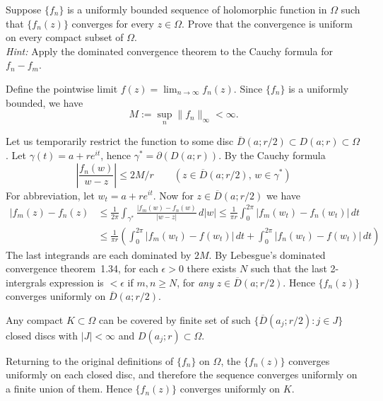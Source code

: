 \begin{enumerate}
\begin{excopy} 
Suppose 
\label{ex:fn:uniform}
\(\{f_n\}\) is a uniformly bounded sequence of holomorphic function
in \(\Omega\) such that  \(\{f_n(z)\}\) converges for every \(z\in \Omega\).
Prove that the convergence is uniform on every compact subset of \(\Omega\).
\\ \emph{Hint:} Apply the dominated convergence theorem to the Cauchy formula
for \(f_n - f_m\).
\end{excopy}

Define the pointwise limit \(f(z) = \lim_{n\to\infty} f_n(z)\).
Since \(\{f_n\}\) is a uniformly bounded, we have
\begin{equation*}
M := \sup_n \|f_n\|_\infty < \infty.
\end{equation*}

Let us temporarily restrict the function to some disc
\(\overline{D}(a;r/2)\subset D(a;r) \subset\Omega\).
Let \(\gamma(t) = a+re^{it}\), hence \(\gamma^* = \partial(D(a;r))\).
By the Cauchy formula
\begin{equation*}
\left| \frac{f_n(w)}{w - z}\right| \leq 2M/r
\qquad (z\in \overline{D}(a;r/2),\, w \in \gamma^*)
\end{equation*}
For abbreviation, let \(w_t = a+re^{it}\).
Now for \(z\in \overline{D}(a;r/2)\) we have
\begin{align*}
|f_m(z) - f_n(z) 
&\leq \frac{1}{2\pi} \int_{\gamma^*} \frac{|f_m(w)-f_n(w)}{|w-z|}\,d|w|
 \leq \frac{1}{\pi r}  \int_0^{2\pi} |f_m(w_t)-f_n(w_t)|\,dt \\
& \leq \frac{1}{\pi r}  
       \left(\int_0^{2\pi} |f_m(w_t)-f(w_t)|\,dt +
             \int_0^{2\pi} |f_n(w_t)-f(w_t)|\,dt\right)
\end{align*}
The last integrands are each dominated by \(2M\).
By Lebesgue's dominated convergence theorem~1.34,
for each \(\epsilon>0\) there exists $N$ such that 
the last 2-intergrals expression is \(<\epsilon\)
if \(m,n\geq N\), for \emph{any} \(z\in \overline{D}(a;r/2)\).
Hence \(\{f_n(z)\}\) converges uniformly on \(\overline{D}(a;r/2)\).

Any compact \(K\subset\Omega\) can be covered by finite set
of such \(\{\overline{D}(a_j;r/2): j\in J\}\) closed discs
with \(|J|<\infty\) and \(D(a_j;r)\subset \Omega\).

Returning to the original definitions of \(\{f_n\}\) on \(\Omega\),
the  \(\{f_n(z)\}\) converges uniformly on each closed disc, 
and therefore the sequence converges uniformly on a finite union of them.
Hence  \(\{f_n(z)\}\) converges uniformly on $K$.


\end{enumerate}
